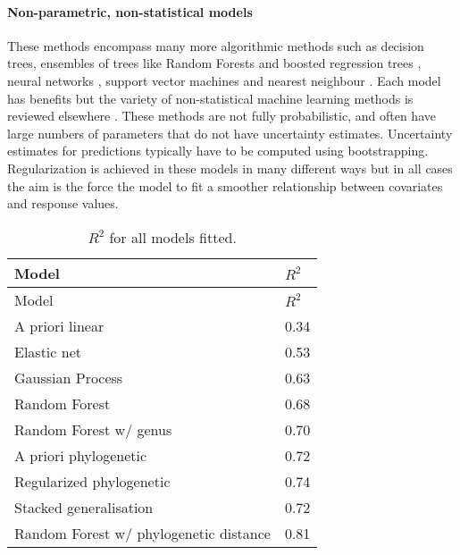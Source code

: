 \documentclass[12pt]{article}
\let\oldparagraph\paragraph
\renewcommand{\paragraph}[1]{\oldparagraph{#1}\mbox{}}
\begin{document}
\begin{figure*}[h!]
{\begin{minipage}{1.1\textwidth}
\paragraph{Non-parametric, non-statistical models}
These methods encompass many more algorithmic methods \citep{crisci2012review} such as decision trees, ensembles of trees like Random Forests \citep{breiman2001random} and boosted regression trees \citep{elith2008working, friedman2001greedy}, neural networks \citep{neuralnets}, support vector machines \citep{svm} and nearest neighbour \citep{altman1992introduction}.
Each model has benefits but the variety of non-statistical machine learning methods is reviewed elsewhere \citep{crisci2012review}.
These methods are not fully probabilistic, and often have large numbers of parameters that do not have uncertainty estimates.
Uncertainty estimates for predictions typically have to be computed using bootstrapping.
Regularization is achieved in these models in many different ways but in all cases the aim is the force the model to fit a smoother relationship between covariates and response values.

\end{minipage}

}
\normalcolor
\end{figure*}


\clearpage


\begin{table}[t!]
\begin{longtable}[c]{@{}ll@{}}
\caption{\(R^2\) for all models fitted. \label{tbl:allr2}}\tabularnewline
\toprule
Model & \(R^2\)\tabularnewline
\midrule
\endfirsthead
\toprule
Model & \(R^2\)\tabularnewline
\midrule
\endhead
A priori linear & 0.34\tabularnewline
Elastic net & 0.53\tabularnewline
Gaussian Process & 0.63\tabularnewline
Random Forest & 0.68\tabularnewline
Random Forest w/ genus & 0.70\tabularnewline
A priori phylogenetic & 0.72\tabularnewline
Regularized phylogenetic & 0.74\tabularnewline
Stacked generalisation & 0.72\tabularnewline
Random Forest w/ phylogenetic distance & 0.81\tabularnewline
\bottomrule
\end{longtable}
\end{table}


\clearpage
\end{document}
